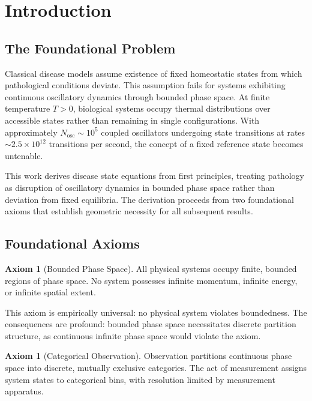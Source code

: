 \documentclass[11pt,twocolumn,a4paper]{article}
\theoremstyle{definition}
\newtheorem{axiom}[theorem]{Axiom}
\theoremstyle{remark}
\begin{document}
\section{Introduction}
\label{sec:introduction}

\subsection{The Foundational Problem}

Classical disease models assume existence of fixed homeostatic states from which pathological conditions deviate. This assumption fails for systems exhibiting continuous oscillatory dynamics through bounded phase space. At finite temperature $T > 0$, biological systems occupy thermal distributions over accessible states rather than remaining in single configurations. With approximately $N_{\mathrm{osc}} \sim 10^5$ coupled oscillators undergoing state transitions at rates $\sim 2.5 \times 10^{12}$ transitions per second, the concept of a fixed reference state becomes untenable.

This work derives disease state equations from first principles, treating pathology as disruption of oscillatory dynamics in bounded phase space rather than deviation from fixed equilibria. The derivation proceeds from two foundational axioms that establish geometric necessity for all subsequent results.

\subsection{Foundational Axioms}

\begin{axiom}[Bounded Phase Space]
\label{ax:bounded}
All physical systems occupy finite, bounded regions of phase space. No system possesses infinite momentum, infinite energy, or infinite spatial extent.
\end{axiom}

This axiom is empirically universal: no physical system violates boundedness. The consequences are profound: bounded phase space necessitates discrete partition structure, as continuous infinite phase space would violate the axiom.

\begin{axiom}[Categorical Observation]
\label{ax:categorical}
Observation partitions continuous phase space into discrete, mutually exclusive categories. The act of measurement assigns system states to categorical bins, with resolution limited by measurement apparatus.
\end{axiom}
\end{document}
